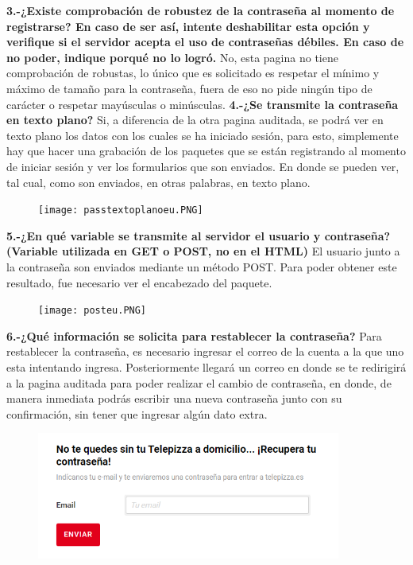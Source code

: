 \documentclass{article}
\begin{document}
\newline
\textbf{3.-¿Existe comprobación de robustez de la contraseña al momento de registrarse? En caso de ser así, intente deshabilitar esta opción y verifique si el servidor acepta el uso de contraseñas débiles. En caso de no poder, indique porqué no lo logró.}
\newline
No, esta pagina no tiene comprobación de robustas, lo único que es solicitado es respetar el mínimo y máximo de tamaño para la contraseña, fuera de eso no pide ningún tipo de carácter o respetar mayúsculas o minúsculas.
\newpage
\textbf{ 4.-¿Se transmite la contraseña en texto plano?}
\newline
Si, a diferencia de la otra pagina auditada, se podrá ver en texto plano los datos con los cuales se ha iniciado sesión, para esto, simplemente hay que hacer una grabación de los paquetes que se están registrando al momento de iniciar sesión y ver los formularios que son enviados. En donde se pueden ver, tal cual, como son enviados, en otras palabras, en texto plano. 
\begin{figure}[h!]
    \centering
    \texttt{[image: passtextoplanoeu.PNG]}
\end{figure}
\newline
\textbf{ 5.-¿En qué variable se transmite al servidor el usuario y contraseña? (Variable utilizada en GET o POST, no en el HTML)}
\newline
El usuario junto a la contraseña son enviados mediante un método POST. Para poder obtener este resultado, fue necesario ver el encabezado del paquete. 
\begin{figure}[h!]
    \centering
    \texttt{[image: posteu.PNG]}
\end{figure}
\newline
\textbf{ 6.-¿Qué información se solicita para restablecer la contraseña?}
\newline
Para restablecer la contraseña, es necesario ingresar el correo de la cuenta a la que uno esta intentando ingresa. Posteriormente llegará un correo en donde se te redirigirá a la pagina auditada para poder realizar el cambio de contraseña, en donde, de manera inmediata podrás escribir una nueva contraseña junto con su confirmación, sin tener que ingresar algún dato extra.
\begin{figure}[h!]
    \centering
    \includegraphics[width=10cm]{olvidepasseu.PNG}
\end{figure}
\end{document}
